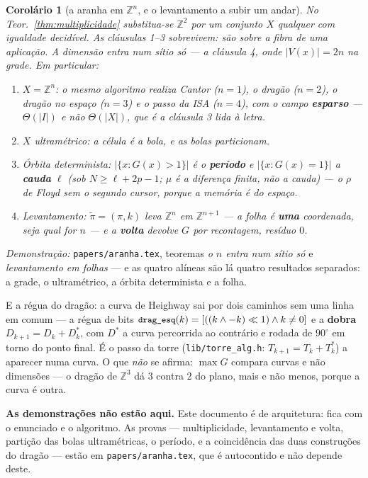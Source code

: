 \documentclass[11pt,a4paper]{article}
\newcommand{\code}[1]{\texttt{\small #1}}
\newcommand{\Z}{\ensuremath{\mathbb{Z}}}
\newtheorem{corolario}[teorema]{Corolário}
\begin{document}
\begin{corolario}[a aranha em $\Z^{n}$, e o levantamento a subir um andar]\label{cor:aranha-n}
No Teor.~\ref{thm:multiplicidade} substitua-se $\Z^{2}$ por um conjunto $X$
qualquer com igualdade decidível. As cláusulas 1--3 sobrevivem: são sobre a
fibra de \emph{uma aplicação}. A dimensão entra num sítio só --- a cláusula 4,
onde $|V(x)|=2n$ na grade. Em particular:
\begin{enumerate}\itemsep2pt
\item $X=\Z^{n}$: o mesmo algoritmo realiza Cantor ($n{=}1$), o dragão ($n{=}2$),
      o dragão no espaço ($n{=}3$) e o passo da ISA ($n{=}4$), com o campo
      \textbf{esparso} --- $\Theta(|I|)$ e não $\Theta(|X|)$, que é a cláusula 3
      lida à letra.
\item $X$ ultramétrico: a célula \emph{é} a bola, e as bolas particionam.
\item Órbita determinista: $|\{x:G(x)>1\}|$ é o \textbf{período} e
      $|\{x:G(x)=1\}|$ a \textbf{cauda} $\ell$ (sob $N\ge\ell+2p-1$; $\mu$ é a
      diferença finita, não a cauda) --- o $\rho$ de
      Floyd sem o segundo cursor, porque a memória é do espaço.
\item Levantamento: $\tilde\pi=(\pi,k)$ leva $\Z^{n}$ em $\Z^{n+1}$ --- a folha é
      \textbf{uma} coordenada, seja qual for $n$ --- e a \textbf{volta} devolve
      $G$ por recontagem, resíduo $0$.
\end{enumerate}
\end{corolario}

\noindent\emph{Demonstração:} \code{papers/aranha.tex}, teoremas \emph{o $n$
entra num sítio só} e \emph{levantamento em folhas} --- e as quatro alíneas são
lá quatro resultados separados: a grade, o ultramétrico, a órbita determinista e
a folha.

\medskip\noindent E a régua do dragão: a curva de Heighway sai por dois caminhos
sem uma linha em comum --- a régua de bits
$\code{drag\_esq}(k)=[((k\wedge-k)\ll1)\wedge k\neq0]$ e a \textbf{dobra}
$D_{k+1}=D_{k}+D_{k}^{*}$, com $D^{*}$ a curva percorrida ao contrário e rodada
de $90^{\circ}$ em torno do ponto final. É o passo da torre
(\code{lib/torre\_alg.h}: $T_{k+1}=T_{k}+T_{k}^{*}$) a aparecer numa curva.
O que \emph{não} se afirma: $\max G$ compara curvas e não dimensões --- o dragão
de $\Z^{3}$ dá $3$ contra $2$ do plano, mais e não menos, porque a curva é outra.

\medskip\noindent\textbf{As demonstrações não estão aqui.} Este documento é de
arquitetura: fica com o enunciado e o algoritmo. As provas --- multiplicidade,
levantamento e volta, partição das bolas ultramétricas, o período, e a
coincidência das duas construções do dragão --- estão em
\code{papers/aranha.tex}, que é autocontido e não depende deste.
\end{document}
